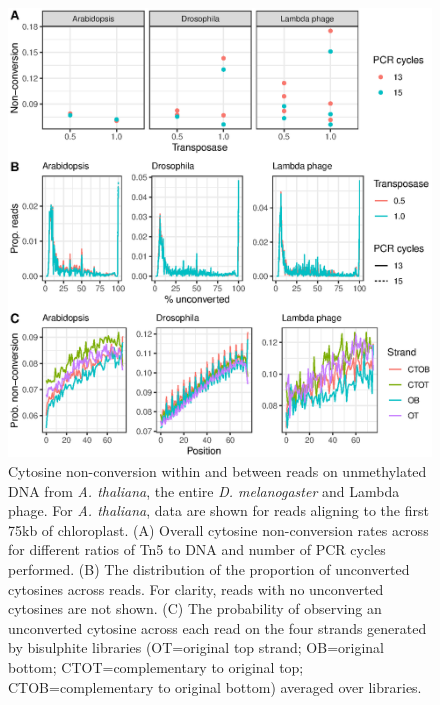 \documentclass[12pt,longbibliography]{article}
\begin{document}
\begin{figure}
    \includegraphics{figure1.eps}
    \caption{
        Cytosine non-conversion within and between reads on unmethylated DNA from \textit{A. thaliana}, the entire \textit{D. melanogaster} and Lambda phage. For \textit{A. thaliana}, data are shown for reads aligning to the first 75kb of chloroplast.
        (A) Overall cytosine non-conversion rates across for different ratios of Tn5 to DNA and number of PCR cycles performed.
        (B) The distribution of the proportion of unconverted cytosines across reads. For clarity, reads with no unconverted cytosines are not shown.
        (C) The probability of observing an unconverted cytosine across each read on the four strands generated by bisulphite libraries (OT=original top strand; OB=original bottom; CTOT=complementary to original top; CTOB=complementary to original bottom) averaged over libraries.
    }
    \label{fig:reads}

\end{figure}
\end{document}
